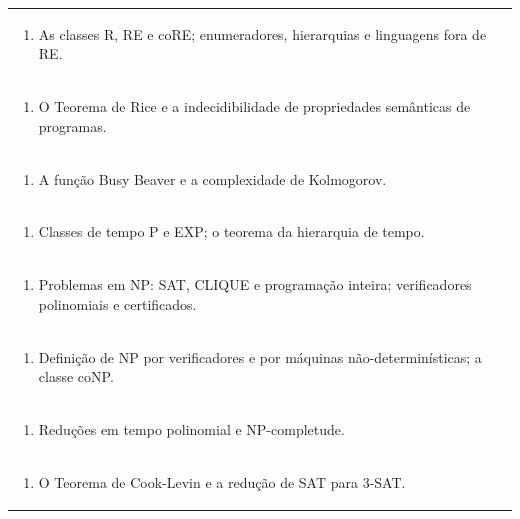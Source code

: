 \documentclass[11pt]{article}
\begin{document}
\begin{center}
\begin{longtable}{|p{4cm}|p{4cm}|p{4cm}|p{4cm}|}
\multicolumn{4}{|p{\dimexpr 16cm + 6\tabcolsep\relax}|}{\begin{enumerate}[start=8]\item As classes R, RE e coRE; enumeradores, hierarquias e linguagens fora de RE.\end{enumerate}}\\
\multicolumn{4}{|p{\dimexpr 16cm + 6\tabcolsep\relax}|}{\begin{enumerate}[start=9]\item O Teorema de Rice e a indecidibilidade de propriedades semânticas de programas.\end{enumerate}}\\
\multicolumn{4}{|p{\dimexpr 16cm + 6\tabcolsep\relax}|}{\begin{enumerate}[start=10]\item A função Busy Beaver e a complexidade de Kolmogorov.\end{enumerate}}\\
\multicolumn{4}{|p{\dimexpr 16cm + 6\tabcolsep\relax}|}{\begin{enumerate}[start=11]\item Classes de tempo P e EXP; o teorema da hierarquia de tempo.\end{enumerate}}\\
\multicolumn{4}{|p{\dimexpr 16cm + 6\tabcolsep\relax}|}{\begin{enumerate}[start=12]\item Problemas em NP: SAT, CLIQUE e programação inteira; verificadores polinomiais e certificados.\end{enumerate}}\\
\multicolumn{4}{|p{\dimexpr 16cm + 6\tabcolsep\relax}|}{\begin{enumerate}[start=13]\item Definição de NP por verificadores e por máquinas não-determinísticas; a classe coNP.\end{enumerate}}\\
\multicolumn{4}{|p{\dimexpr 16cm + 6\tabcolsep\relax}|}{\begin{enumerate}[start=14]\item Reduções em tempo polinomial e NP-completude.\end{enumerate}}\\
\multicolumn{4}{|p{\dimexpr 16cm + 6\tabcolsep\relax}|}{\begin{enumerate}[start=15]\item O Teorema de Cook-Levin e a redução de SAT para 3-SAT.\end{enumerate}}\\

\end{longtable}
\end{center}
\end{document}
